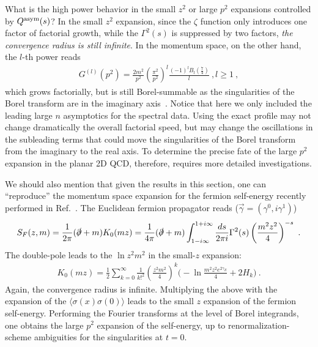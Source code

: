 \documentclass[a4paper,11pt]{article}
\begin{document}
What is the high power behavior in the small $z^2$ or large $p^2$ expansions controlled by $Q^{\rm asym}(s)$? In the small $z^2$ expansion, since the $\zeta$ function only introduces one factor of factorial growth, while the $\Gamma^2(s)$ is suppressed by two factors, {\it the convergence radius is still infinite}. In the momentum space, on the other hand, the $l$-th power reads
\begin{align}
G^{(l)}(p^2)=\frac{2m^2}{p^2}\left(\frac{\pi^2}{p^2}\right)^l\frac{(-1)^lB_l\left(\frac{7}{4}\right) }{ l} \ , l\ge 1 \ , 
\end{align}
which grows factorially, but is still Borel-summable as the singularities of the Borel transform are in the imaginary axis~\cite{Boito:2017cnp}. Notice that here we only included the leading large $n$ asymptotics for the spectral data. Using the exact profile may not change dramatically the overall factorial speed, but may change the oscillations in the subleading terms that could move the singularities of the Borel transform from the imaginary to the real axis. To determine the precise fate of the large $p^2$ expansion in the planar 2D QCD, therefore, requires more detailed investigations. 



We should also mention that given the results in this section, one can ``reproduce'' the momentum space expansion for the fermion self-energy recently performed in Ref.~\cite{Marino:2024uco}. The Euclidean fermion propagator reads ($\vec{\gamma}=(\gamma^0,i\gamma^1)$)
\begin{align}
S_F(z,m)=\frac{1}{2\pi}(\slashed\partial+m)K_0(mz)=\frac{1}{4\pi} (\slashed\partial+m)\int_{1-i\infty}^{1+i\infty} \frac{ds}{2\pi i}\Gamma^2(s) \left(\frac{m^2z^2}{4}\right)^{-s}\ .
\end{align}
The double-pole leads to the $\ln z^2m^2$ in the small-$z$ expansion:
\begin{align}
K_0(mz)=\frac{1}{2}\sum_{k=0}^{\infty}\frac{1}{k!^2}\left(\frac{z^2m^2}{4}\right)^k \bigg(-\ln \frac{m^2z^2e^{2\gamma_E}}{4}+2H_{k}\bigg) \ .
\end{align}
Again, the convergence radius is infinite. Multiplying the above with the expansion of the $\langle \sigma(x)\sigma(0) \rangle$ leads to the small $z$ expansion of the fermion self-energy. Performing the Fourier transforms at the level of Borel integrands, one obtains the large $p^2$ expansion of the self-energy, up to renormalization-scheme ambiguities for the  singularities at $t=0$. 
\end{document}
